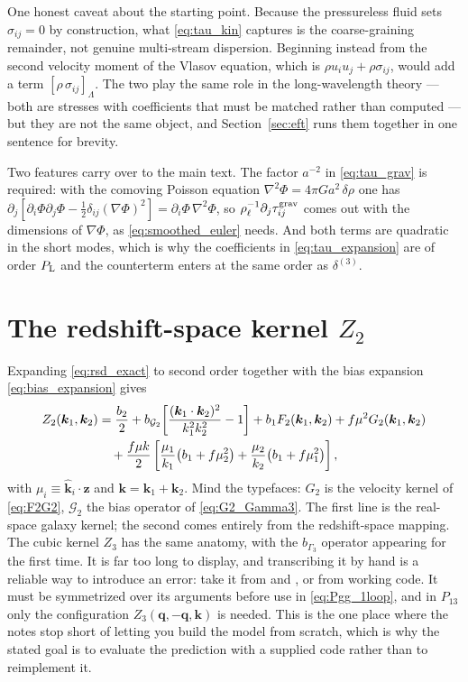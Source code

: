 \documentclass[a4paper,11pt]{article}
\newcommand{\vq}{\bm{q}}
\newcommand{\vk}{\bm{k}}
\newcommand{\nhat}{\hat{\bm{z}}}
\newcommand{\khat}{\hat{\bm{k}}}
\def\Plin{P_{\rm L}}
\def\G{\mathcal{G}}
\numberwithin{equation}{section}
\begin{document}
One honest caveat about the starting point. Because the pressureless fluid sets
$\sigma_{ij}=0$ by construction, what \eqref{eq:tau_kin} captures is the
coarse-graining remainder, not genuine multi-stream dispersion. Beginning
instead from the second velocity moment of the Vlasov equation, which is
$\rho u_iu_j + \rho\sigma_{ij}$, would add a term $[\rho\,\sigma_{ij}]_\Lambda$.
The two play the same role in the long-wavelength theory --- both are stresses
with coefficients that must be matched rather than computed --- but they are not
the same object, and Section~\ref{sec:eft} runs them together in one sentence
for brevity.

Two features carry over to the main text. The factor $a^{-2}$ in
\eqref{eq:tau_grav} is required: with the comoving Poisson equation
$\nabla^2\Phi = 4\pi G a^2\,\delta\rho$ one has
$\partial_j[\partial_i\Phi\partial_j\Phi
- \tfrac12\delta_{ij}(\nabla\Phi)^2] = \partial_i\Phi\,\nabla^2\Phi$, so
$\rho_\ell^{-1}\partial_j\tau^{\rm grav}_{ij}$ comes out with the dimensions of
$\nabla\Phi$, as \eqref{eq:smoothed_euler} needs. And both terms are quadratic
in the short modes, which is why the coefficients in \eqref{eq:tau_expansion}
are of order $\Plin$ and the counterterm enters at the same order as
$\delta^{(3)}$.

\section{The redshift-space kernel \texorpdfstring{$Z_2$}{Z2}}
\label{app:zkernels}

Expanding \eqref{eq:rsd_exact} to second order together with the bias expansion
\eqref{eq:bias_expansion} gives \cite[Eq.~(2.14b)]{ClassPT2020}
\begin{align}
Z_2(\vk_1,\vk_2) &= \frac{b_2}{2}
+ b_{\G_2}\!\left[\frac{(\vk_1\cdot\vk_2)^2}{k_1^2k_2^2}-1\right]
+ b_1 F_2(\vk_1,\vk_2) + f\mu^2 G_2(\vk_1,\vk_2)
\notag\\
&\quad
+ \frac{f\mu k}{2}\left[\frac{\mu_1}{k_1}\big(b_1 + f\mu_2^2\big)
+ \frac{\mu_2}{k_2}\big(b_1 + f\mu_1^2\big)\right],
\label{eq:Z2}
\end{align}
with $\mu_i \equiv \khat_i\cdot\nhat$ and $\vk = \vk_1+\vk_2$. Mind the
typefaces: $G_2$ is the velocity kernel of \eqref{eq:F2G2}, $\G_2$ the bias
operator of \eqref{eq:G2_Gamma3}. The first line is the real-space galaxy
kernel; the second comes entirely from the redshift-space mapping. The cubic
kernel $Z_3$ has the same anatomy, with the $b_{\Gamma_3}$ operator appearing
for the first time. It is far too long to display, and transcribing it by hand
is a reliable way to introduce an error: take it from
\cite[Eq.~(2.14c)]{ClassPT2020} and \cite{Nguyen2025}, or from working code. It
must be symmetrized over its arguments before use in \eqref{eq:Pgg_1loop}, and
in $P_{13}$ only the configuration $Z_3(\vq,-\vq,\vk)$ is needed. This is the
one place where the notes stop short of letting you build the model from
scratch, which is why the stated goal is to evaluate the prediction with a
supplied code rather than to reimplement it.
\end{document}

